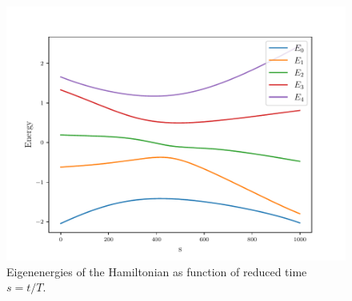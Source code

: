 \begin{figure}[H]
    \centering
    \includegraphics[width=\textwidth]{Figures/Eigenenergies.pdf}
    \caption{Eigenenergies of the Hamiltonian as function of reduced time $s=t/T$.}
    \label{fig:Eigenenergies}
\end{figure}
